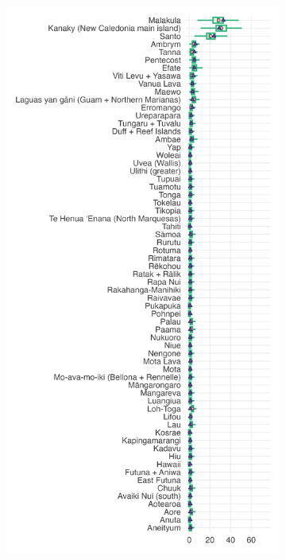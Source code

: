 \documentclass[unnumsec,webpdf,modern,medium]{oup-authoring-template}
\begin{document}

\begin{figure}
\centering
\begin{subfigure}{0.48\textwidth}
  \centering
\includegraphics[width=1\textwidth]{brms_predict_medium_control_spatialphylo.png}

\end{subfigure}
\end{figure}
\end{document}

